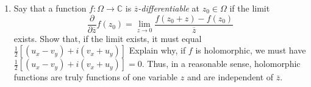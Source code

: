\documentclass[10pt]{article}
\newcommand{\C}{\mathbb{C}}
\renewcommand{\bar}{\overline}
\begin{document}
\begin{enumerate}
\begin{proof}
Substituting $u_x = 0$ into the system we derived, we find that $vu_y = 0$ and $uu_y = 0$.  Multiplying the first equation by $v$ and the second by $u$ then summing gives
$$
v^2u_y + u^2u_y = |f(z)|^2 u_y = 0.
$$
We have assumed $|f(z)|^2 \neq 0$, which gives that $u_y=0$.

By applying the Cauchy-Riemann equations again, we now have $u_x = u_y = v_x = v_y = 0$.  So, by the formula for the derivative we stated earlier, $f'=0$.  Again, by the corollary, $f$ is constant.
\end{proof}

\item Say that a function $f:\Omega \rightarrow \C$ is \emph{$\bar{z}$-differentiable} at $z_0 \in \Omega$ if the limit
$$
\frac{\partial}{\partial \bar{z}} f(z_0) = \lim_{z \rightarrow 0} \frac{f(z_0 + z) - f(z_0)}{\bar{z}}
$$
exists.  Show that, if the limit exists, it must equal
$
\frac12 [(u_x - v_y) + i(v_x + u_y)]
$
Explain why, if $f$ is holomorphic, we must have
$
\frac12 [(u_x - v_y) + i(v_x + u_y)] = 0.
$
Thus, in a reasonable sense, holomorphic functions are truly functions of one variable $z$ and are independent of $\bar{z}$.


\end{enumerate}
\end{document}
